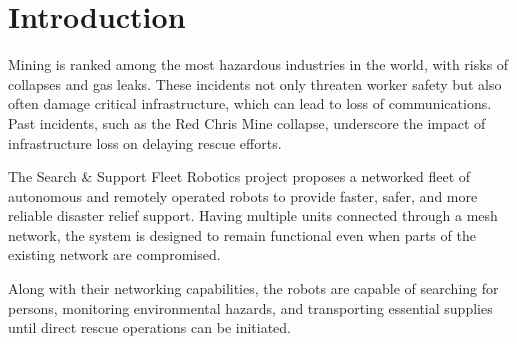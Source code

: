 \section{Introduction}
\label{sec:introduction}

Mining is ranked among the most hazardous industries in the world, with risks of collapses and gas leaks. These incidents not only threaten worker safety but also often damage critical infrastructure, which can lead to loss of communications. Past incidents, such as the Red Chris Mine collapse, underscore the impact of infrastructure loss on delaying rescue efforts.

The Search \& Support Fleet Robotics project proposes a networked fleet of autonomous and remotely operated robots to provide faster, safer, and more reliable disaster relief support. Having multiple units connected through a mesh network, the system is designed to remain functional even when parts of the existing network are compromised.

Along with their networking capabilities, the robots are capable of searching for \gls{persons}, monitoring environmental hazards, and transporting essential supplies until direct rescue operations can be initiated. 
